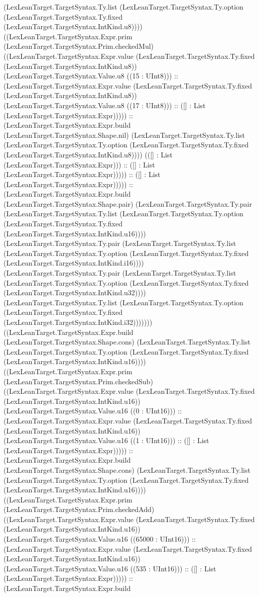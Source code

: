 \documentclass[11pt]{article}
\begin{document}
(LexLeanTarget.TargetSyntax.Ty.list (LexLeanTarget.TargetSyntax.Ty.option (LexLeanTarget.TargetSyntax.Ty.fixed (LexLeanTarget.TargetSyntax.IntKind.u8)))) ((LexLeanTarget.TargetSyntax.Expr.prim (LexLeanTarget.TargetSyntax.Prim.checkedMul) ((LexLeanTarget.TargetSyntax.Expr.value (LexLeanTarget.TargetSyntax.Ty.fixed (LexLeanTarget.TargetSyntax.IntKind.u8)) (LexLeanTarget.TargetSyntax.Value.u8 ((15 : UInt8))) :: (LexLeanTarget.TargetSyntax.Expr.value (LexLeanTarget.TargetSyntax.Ty.fixed (LexLeanTarget.TargetSyntax.IntKind.u8)) (LexLeanTarget.TargetSyntax.Value.u8 ((17 : UInt8))) :: ([] : List (LexLeanTarget.TargetSyntax.Expr))))) :: (LexLeanTarget.TargetSyntax.Expr.build (LexLeanTarget.TargetSyntax.Shape.nil) (LexLeanTarget.TargetSyntax.Ty.list (LexLeanTarget.TargetSyntax.Ty.option (LexLeanTarget.TargetSyntax.Ty.fixed (LexLeanTarget.TargetSyntax.IntKind.u8)))) (([] : List (LexLeanTarget.TargetSyntax.Expr))) :: ([] : List (LexLeanTarget.TargetSyntax.Expr))))) :: ([] : List (LexLeanTarget.TargetSyntax.Expr))))) :: (LexLeanTarget.TargetSyntax.Expr.build (LexLeanTarget.TargetSyntax.Shape.pair) (LexLeanTarget.TargetSyntax.Ty.pair (LexLeanTarget.TargetSyntax.Ty.list (LexLeanTarget.TargetSyntax.Ty.option (LexLeanTarget.TargetSyntax.Ty.fixed (LexLeanTarget.TargetSyntax.IntKind.u16)))) (LexLeanTarget.TargetSyntax.Ty.pair (LexLeanTarget.TargetSyntax.Ty.list (LexLeanTarget.TargetSyntax.Ty.option (LexLeanTarget.TargetSyntax.Ty.fixed (LexLeanTarget.TargetSyntax.IntKind.i16)))) (LexLeanTarget.TargetSyntax.Ty.pair (LexLeanTarget.TargetSyntax.Ty.list (LexLeanTarget.TargetSyntax.Ty.option (LexLeanTarget.TargetSyntax.Ty.fixed (LexLeanTarget.TargetSyntax.IntKind.u32)))) (LexLeanTarget.TargetSyntax.Ty.list (LexLeanTarget.TargetSyntax.Ty.option (LexLeanTarget.TargetSyntax.Ty.fixed (LexLeanTarget.TargetSyntax.IntKind.i32))))))) ((LexLeanTarget.TargetSyntax.Expr.build (LexLeanTarget.TargetSyntax.Shape.cons) (LexLeanTarget.TargetSyntax.Ty.list (LexLeanTarget.TargetSyntax.Ty.option (LexLeanTarget.TargetSyntax.Ty.fixed (LexLeanTarget.TargetSyntax.IntKind.u16)))) ((LexLeanTarget.TargetSyntax.Expr.prim (LexLeanTarget.TargetSyntax.Prim.checkedSub) ((LexLeanTarget.TargetSyntax.Expr.value (LexLeanTarget.TargetSyntax.Ty.fixed (LexLeanTarget.TargetSyntax.IntKind.u16)) (LexLeanTarget.TargetSyntax.Value.u16 ((0 : UInt16))) :: (LexLeanTarget.TargetSyntax.Expr.value (LexLeanTarget.TargetSyntax.Ty.fixed (LexLeanTarget.TargetSyntax.IntKind.u16)) (LexLeanTarget.TargetSyntax.Value.u16 ((1 : UInt16))) :: ([] : List (LexLeanTarget.TargetSyntax.Expr))))) :: (LexLeanTarget.TargetSyntax.Expr.build (LexLeanTarget.TargetSyntax.Shape.cons) (LexLeanTarget.TargetSyntax.Ty.list (LexLeanTarget.TargetSyntax.Ty.option (LexLeanTarget.TargetSyntax.Ty.fixed (LexLeanTarget.TargetSyntax.IntKind.u16)))) ((LexLeanTarget.TargetSyntax.Expr.prim (LexLeanTarget.TargetSyntax.Prim.checkedAdd) ((LexLeanTarget.TargetSyntax.Expr.value (LexLeanTarget.TargetSyntax.Ty.fixed (LexLeanTarget.TargetSyntax.IntKind.u16)) (LexLeanTarget.TargetSyntax.Value.u16 ((65000 : UInt16))) :: (LexLeanTarget.TargetSyntax.Expr.value (LexLeanTarget.TargetSyntax.Ty.fixed (LexLeanTarget.TargetSyntax.IntKind.u16)) (LexLeanTarget.TargetSyntax.Value.u16 ((535 : UInt16))) :: ([] : List (LexLeanTarget.TargetSyntax.Expr))))) :: (LexLeanTarget.TargetSyntax.Expr.build 
\end{document}
